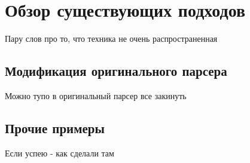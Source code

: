 \section{Обзор существующих подходов}
Пару слов про то, что техника не очень распространенная

\subsection{Модификация оригинального парсера}
Можно тупо в оригинальный парсер все закинуть

\subsection{Прочие примеры}
Если успею - как сделали там
